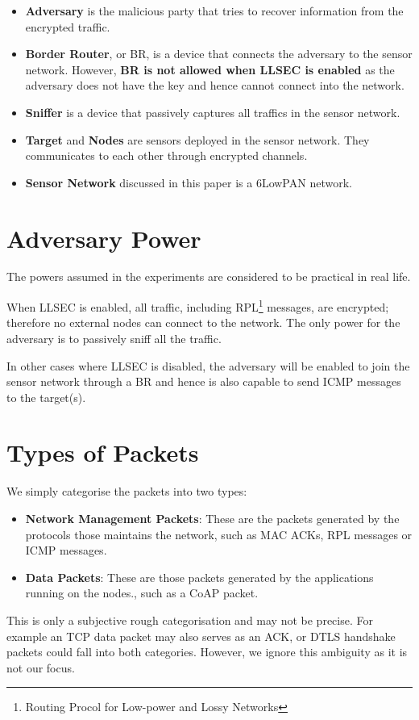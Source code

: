 \begin{itemize}
\item{\bf Adversary} is the malicious party that tries to recover information from the encrypted traffic.
\item{\bf Border Router}, or BR, is a device that connects the adversary to the sensor network. However, \textbf{BR is not allowed when LLSEC is enabled} as the adversary does not have the key and hence cannot connect into the network. 
\item{\bf Sniffer} is a device that passively captures all traffics in the sensor network. 
\item{\bf Target} and {\bf Nodes} are sensors deployed in the sensor network. They communicates to each other through encrypted channels.
\item{\bf Sensor Network} discussed in this paper is a 6LowPAN network.
\end{itemize}

\section{Adversary Power}
The powers assumed in the experiments are considered to be practical in real life.

When LLSEC is enabled, all traffic, including RPL\footnote{Routing Procol for Low-power and Lossy Networks} messages, are encrypted; therefore no external nodes can connect to the network. The only power for the adversary is to passively sniff all the traffic.

In other cases where LLSEC is disabled, the adversary will be  enabled to join the sensor network through a BR and hence is also capable to send ICMP messages to the target(s).

\section{Types of Packets}
We simply categorise the packets into two types:
\begin{itemize}
\item {\bf Network Management Packets}: These are the packets generated by the protocols those maintains the network, such as MAC ACKs, RPL messages or ICMP messages.
\item {\bf Data Packets}: These are those packets generated by the applications running on the nodes., such as a CoAP packet.
\end{itemize}

This is only a subjective rough categorisation and may not be precise. For example an TCP data packet may also serves as an ACK, or DTLS handshake packets could fall into both categories. However, we ignore this ambiguity as it is not our focus.